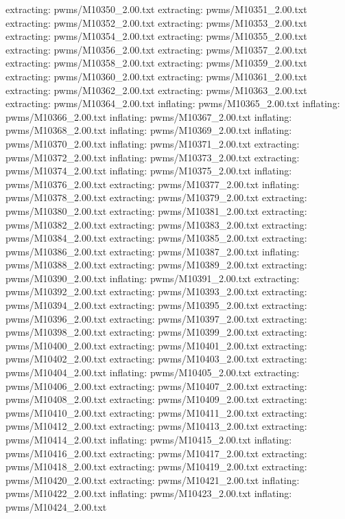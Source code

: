 \documentclass[letterpaper,10pt,english]{sphinxmanual}
\begin{document}
{\begin{sphinxVerbatim}[commandchars=\\\{\}]
 extracting: pwms/M10350\_2.00.txt
 extracting: pwms/M10351\_2.00.txt
 extracting: pwms/M10352\_2.00.txt
 extracting: pwms/M10353\_2.00.txt
 extracting: pwms/M10354\_2.00.txt
 extracting: pwms/M10355\_2.00.txt
 extracting: pwms/M10356\_2.00.txt
 extracting: pwms/M10357\_2.00.txt
 extracting: pwms/M10358\_2.00.txt
 extracting: pwms/M10359\_2.00.txt
 extracting: pwms/M10360\_2.00.txt
 extracting: pwms/M10361\_2.00.txt
 extracting: pwms/M10362\_2.00.txt
 extracting: pwms/M10363\_2.00.txt
 extracting: pwms/M10364\_2.00.txt
  inflating: pwms/M10365\_2.00.txt
  inflating: pwms/M10366\_2.00.txt
  inflating: pwms/M10367\_2.00.txt
  inflating: pwms/M10368\_2.00.txt
  inflating: pwms/M10369\_2.00.txt
  inflating: pwms/M10370\_2.00.txt
  inflating: pwms/M10371\_2.00.txt
 extracting: pwms/M10372\_2.00.txt
  inflating: pwms/M10373\_2.00.txt
 extracting: pwms/M10374\_2.00.txt
  inflating: pwms/M10375\_2.00.txt
  inflating: pwms/M10376\_2.00.txt
 extracting: pwms/M10377\_2.00.txt
  inflating: pwms/M10378\_2.00.txt
 extracting: pwms/M10379\_2.00.txt
 extracting: pwms/M10380\_2.00.txt
 extracting: pwms/M10381\_2.00.txt
 extracting: pwms/M10382\_2.00.txt
 extracting: pwms/M10383\_2.00.txt
 extracting: pwms/M10384\_2.00.txt
 extracting: pwms/M10385\_2.00.txt
 extracting: pwms/M10386\_2.00.txt
 extracting: pwms/M10387\_2.00.txt
  inflating: pwms/M10388\_2.00.txt
 extracting: pwms/M10389\_2.00.txt
 extracting: pwms/M10390\_2.00.txt
  inflating: pwms/M10391\_2.00.txt
 extracting: pwms/M10392\_2.00.txt
 extracting: pwms/M10393\_2.00.txt
 extracting: pwms/M10394\_2.00.txt
 extracting: pwms/M10395\_2.00.txt
 extracting: pwms/M10396\_2.00.txt
 extracting: pwms/M10397\_2.00.txt
 extracting: pwms/M10398\_2.00.txt
 extracting: pwms/M10399\_2.00.txt
 extracting: pwms/M10400\_2.00.txt
 extracting: pwms/M10401\_2.00.txt
 extracting: pwms/M10402\_2.00.txt
 extracting: pwms/M10403\_2.00.txt
 extracting: pwms/M10404\_2.00.txt
  inflating: pwms/M10405\_2.00.txt
 extracting: pwms/M10406\_2.00.txt
 extracting: pwms/M10407\_2.00.txt
 extracting: pwms/M10408\_2.00.txt
 extracting: pwms/M10409\_2.00.txt
 extracting: pwms/M10410\_2.00.txt
 extracting: pwms/M10411\_2.00.txt
 extracting: pwms/M10412\_2.00.txt
 extracting: pwms/M10413\_2.00.txt
 extracting: pwms/M10414\_2.00.txt
  inflating: pwms/M10415\_2.00.txt
  inflating: pwms/M10416\_2.00.txt
 extracting: pwms/M10417\_2.00.txt
 extracting: pwms/M10418\_2.00.txt
 extracting: pwms/M10419\_2.00.txt
 extracting: pwms/M10420\_2.00.txt
 extracting: pwms/M10421\_2.00.txt
  inflating: pwms/M10422\_2.00.txt
  inflating: pwms/M10423\_2.00.txt
  inflating: pwms/M10424\_2.00.txt

\end{sphinxVerbatim}}
\end{document}
